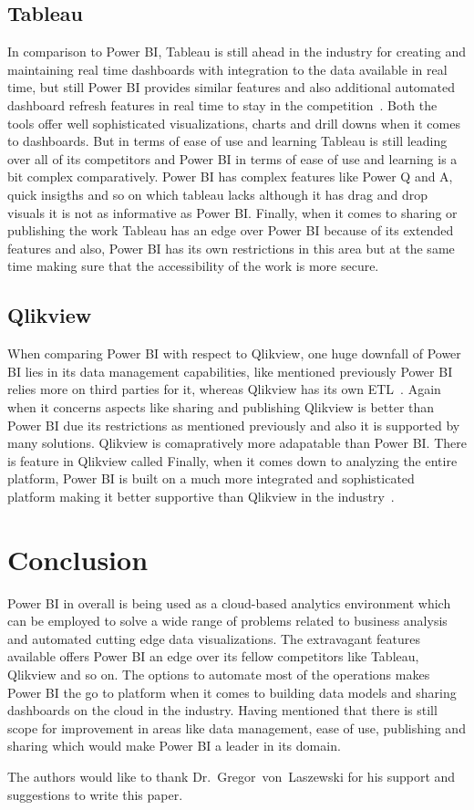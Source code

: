 \subsection{Tableau}
In comparison to Power BI, Tableau is still ahead in the industry for creating and 
maintaining real time dashboards with integration to the data available in real time, 
but still Power BI provides similar features and also additional automated dashboard
refresh features in real time to stay in the competition~\cite{hid-sp18-418-powerbi-comparison}. 
Both the tools offer well sophisticated visualizations, charts and drill downs when 
it comes to dashboards. But in terms of ease of use and learning Tableau is still 
leading over all of its competitors and Power BI in terms of ease of use and learning 
is a bit complex comparatively. Power BI has complex features like Power Q and A, quick 
insigths and so on which tableau lacks although it has drag and drop visuals it is 
not as informative as Power BI\@. Finally, when it comes to sharing or publishing the 
work Tableau has an edge over Power BI because of its extended features and also, 
Power BI has its own restrictions in this area but at the same time making sure that 
the accessibility of the work is more secure.   

\subsection{Qlikview}
When comparing Power BI with respect to Qlikview, one huge downfall of Power BI 
lies in its data management capabilities, like mentioned previously Power BI relies 
more on third parties for it, whereas Qlikview has its own ETL~\cite{hid-sp18-418-powerbi-comparison}. 
Again when it concerns aspects like sharing and publishing Qlikview is better than 
Power BI due its restrictions as mentioned previously and also it is supported by 
many solutions. Qlikview is comapratively more adapatable than Power BI\@. 
There is feature in Qlikview called Finally, when it comes down to analyzing the 
entire platform, Power BI is built on a much more integrated and sophisticated 
platform making it better supportive than Qlikview in the industry~\cite{hid-sp18-418-powerbi-comparison}.

\section{Conclusion}
Power BI in overall is being used as a cloud-based analytics environment which 
can be employed to solve a wide range of problems related to business analysis 
and automated cutting edge data visualizations. The extravagant features 
available offers Power BI an edge over its fellow competitors like Tableau, 
Qlikview and so on. The options to automate most of the operations makes 
Power BI the go to platform when it comes to building data models and sharing 
dashboards on the cloud in the industry. Having mentioned that there is still scope
for improvement in areas like data management, ease of use, publishing and sharing 
which would make Power BI a leader in its domain.
 
\begin{acks}

	The authors would like to thank Dr.~Gregor~von~Laszewski for his
	support and suggestions to write this paper.

\end{acks}




 